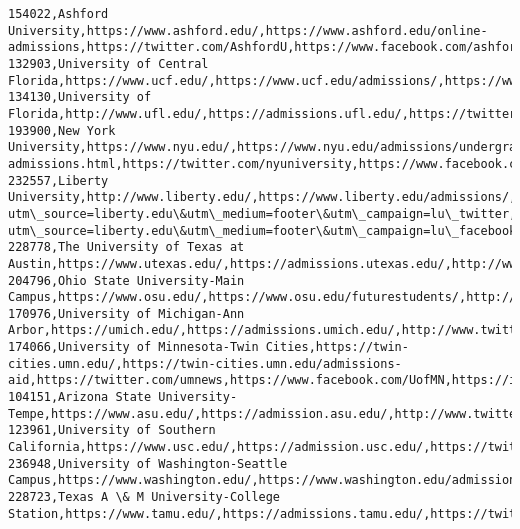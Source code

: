 \documentclass[11pt]{article}
\begin{document}
    \begin{Verbatim}[commandchars=\\\{\}]
154022,Ashford University,https://www.ashford.edu/,https://www.ashford.edu/online-admissions,https://twitter.com/AshfordU,https://www.facebook.com/ashforduniversity,https://instagram.com/ashfordu
132903,University of Central Florida,https://www.ucf.edu/,https://www.ucf.edu/admissions/,https://www.twitter.com/ucf,https://www.facebook.com/ucf,https://www.instagram.com/ucf.edu/
134130,University of Florida,http://www.ufl.edu/,https://admissions.ufl.edu/,https://twitter.com/UF/,http://www.facebook.com/uflorida/,https://instagram.com/uflorida/
193900,New York University,https://www.nyu.edu/,https://www.nyu.edu/admissions/undergraduate-admissions.html,https://twitter.com/nyuniversity,https://www.facebook.com/NYU,https://www.instagram.com/p/Bkfnfy1F0Mg/
232557,Liberty University,http://www.liberty.edu/,https://www.liberty.edu/admissions/,http://twitter.com/libertyu?utm\_source=liberty.edu\&utm\_medium=footer\&utm\_campaign=lu\_twitter,http://www.facebook.com/LibertyUniversity?utm\_source=liberty.edu\&utm\_medium=footer\&utm\_campaign=lu\_facebook,http://www.instagram.com/LibertyUniversity
228778,The University of Texas at Austin,https://www.utexas.edu/,https://admissions.utexas.edu/,http://www.twitter.com/UTAustin,http://www.facebook.com/UTAustinTX,https://www.instagram.com/utaustintx
204796,Ohio State University-Main Campus,https://www.osu.edu/,https://www.osu.edu/futurestudents/,http://twitter.com/OhioState,http://www.facebook.com/osu,https://www.instagram.com/theohiostateuniversity/
170976,University of Michigan-Ann Arbor,https://umich.edu/,https://admissions.umich.edu/,http://www.twitter.com/umich,http://www.facebook.com/universityofmichigan,http://instagram.com/uofmichigan
174066,University of Minnesota-Twin Cities,https://twin-cities.umn.edu/,https://twin-cities.umn.edu/admissions-aid,https://twitter.com/umnews,https://www.facebook.com/UofMN,https://instagram.com/umnpics
104151,Arizona State University-Tempe,https://www.asu.edu/,https://admission.asu.edu/,http://www.twitter.com/asu,http://www.facebook.com/arizonastateuniversity,https://www.instagram.com/FutureSunDevils/
123961,University of Southern California,https://www.usc.edu/,https://admission.usc.edu/,https://twitter.com/usc,https://www.facebook.com/usc/,http://instagram.com/uscedu
236948,University of Washington-Seattle Campus,https://www.washington.edu/,https://www.washington.edu/admissions/,https://twitter.com/UW,https://www.facebook.com/UofWA,http://instagram.com/uofwa
228723,Texas A \& M University-College Station,https://www.tamu.edu/,https://admissions.tamu.edu/,https://twitter.com/tamu,https://www.facebook.com/tamu,https://www.instagram.com/tamu/

\end{Verbatim}
\end{document}
